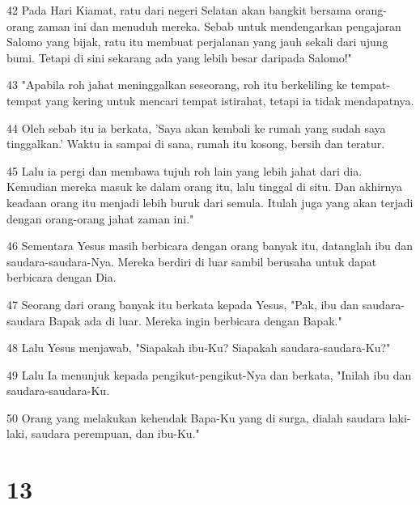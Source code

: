 \par 42 Pada Hari Kiamat, ratu dari negeri Selatan akan bangkit bersama orang-orang zaman ini dan menuduh mereka. Sebab untuk mendengarkan pengajaran Salomo yang bijak, ratu itu membuat perjalanan yang jauh sekali dari ujung bumi. Tetapi di sini sekarang ada yang lebih besar daripada Salomo!"
\par 43 "Apabila roh jahat meninggalkan seseorang, roh itu berkeliling ke tempat-tempat yang kering untuk mencari tempat istirahat, tetapi ia tidak mendapatnya.
\par 44 Oleh sebab itu ia berkata, 'Saya akan kembali ke rumah yang sudah saya tinggalkan.' Waktu ia sampai di sana, rumah itu kosong, bersih dan teratur.
\par 45 Lalu ia pergi dan membawa tujuh roh lain yang lebih jahat dari dia. Kemudian mereka masuk ke dalam orang itu, lalu tinggal di situ. Dan akhirnya keadaan orang itu menjadi lebih buruk dari semula. Itulah juga yang akan terjadi dengan orang-orang jahat zaman ini."
\par 46 Sementara Yesus masih berbicara dengan orang banyak itu, datanglah ibu dan saudara-saudara-Nya. Mereka berdiri di luar sambil berusaha untuk dapat berbicara dengan Dia.
\par 47 Seorang dari orang banyak itu berkata kepada Yesus, "Pak, ibu dan saudara-saudara Bapak ada di luar. Mereka ingin berbicara dengan Bapak."
\par 48 Lalu Yesus menjawab, "Siapakah ibu-Ku? Siapakah saudara-saudara-Ku?"
\par 49 Lalu Ia menunjuk kepada pengikut-pengikut-Nya dan berkata, "Inilah ibu dan saudara-saudara-Ku.
\par 50 Orang yang melakukan kehendak Bapa-Ku yang di surga, dialah saudara laki-laki, saudara perempuan, dan ibu-Ku."

\chapter{13}

